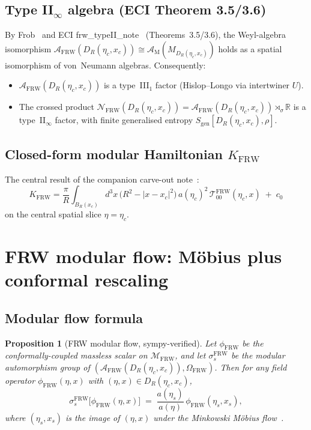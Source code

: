 \documentclass[11pt,a4paper]{article}
\newtheorem{proposition}[theorem]{Proposition}
\theoremstyle{remark}
\newcommand{\FRW}{{\mathrm{FRW}}}
\newcommand{\Mink}{{\mathrm{M}}}
\newcommand{\R}{\mathbb{R}}
\newcommand{\N}{\mathcal{N}}
\newcommand{\A}{\mathcal{A}}
\newcommand{\TT}{\mathcal{T}}
\newcommand{\Sgen}{S_{\mathrm{gen}}}
\newcommand{\KFRW}{K_{\FRW}}
\newcommand{\aetac}{a(\eta_c)}
\newcommand{\DR}{D_R(\eta_c,x_c)}
\newcommand{\sigmats}{\sigma_s^{\FRW}}
\begin{document}
\subsection{Type II$_\infty$ algebra (ECI Theorem 3.5/3.6)}

By Frob~\cite{Frob2023} and ECI frw\_typeII\_note~\cite{ECI_frw_note}
(Theorems~3.5/3.6), the Weyl-algebra isomorphism
$\A_{\FRW}(\DR) \cong \A_{\Mink}(M_{\DR})$ holds as a spatial isomorphism
of von~Neumann algebras.  Consequently:
\begin{itemize}
\item $\A_{\FRW}(\DR)$ is a type~III$_1$ factor (Hislop--Longo via intertwiner $U$).
\item The crossed product $\N_{\FRW}(\DR) = \A_{\FRW}(\DR)\rtimes_\sigma \R$ is a
  type~II$_\infty$ factor, with finite generalised entropy $\Sgen[\DR,\rho]$.
\end{itemize}

\subsection{Closed-form modular Hamiltonian $\KFRW$}

The central result of the companion carve-out note~\cite{ECI_kfrw_note}:
\begin{equation}
\boxed{
  \KFRW = \frac{\pi}{R}\int_{B_R(x_c)} d^3x\,
    \bigl(R^2 - |x - x_c|^2\bigr)\,\aetac^2\,
    \TT_{00}^{\FRW}(\eta_c, x) \;+\; c_0
}
\label{eq:KFRW}
\end{equation}
on the central spatial slice $\eta = \eta_c$.

\section{FRW modular flow: M\"obius plus conformal rescaling}
\label{sec:modular_flow}

\subsection{Modular flow formula}

\begin{proposition}[FRW modular flow, sympy-verified]
\label{prop:flow}
Let $\phi_{\FRW}$ be the conformally-coupled massless scalar on
$\mathcal{M}_{\FRW}$, and let $\sigmats$ be the modular automorphism
group of $(\A_{\FRW}(\DR), \Omega_{\FRW})$.  Then for any field operator
$\phi_{\FRW}(\eta, x)$ with $(\eta, x) \in \DR$,
\begin{equation}
  \sigmats\bigl[\phi_{\FRW}(\eta,x)\bigr]
  \;=\;
  \frac{a(\eta_s)}{a(\eta)}\,\phi_{\FRW}(\eta_s, x_s),
\label{eq:flow}
\end{equation}
where $(\eta_s, x_s)$ is the image of $(\eta, x)$ under the Minkowski
M\"obius flow~\cite{CHM2011}.
\end{proposition}
\end{document}
